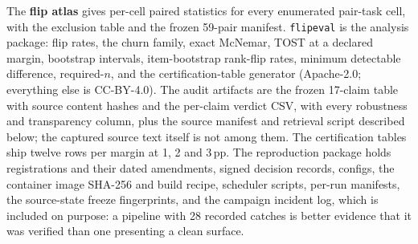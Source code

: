 The \textbf{flip atlas} gives per-cell paired statistics for every enumerated
pair-task cell, with the exclusion table and the frozen 59-pair manifest.
\texttt{flipeval} is the analysis package: flip rates, the churn family, exact
McNemar, TOST at a declared margin, bootstrap intervals, item-bootstrap
rank-flip rates, minimum detectable difference, required-$n$, and the
certification-table generator (Apache-2.0; everything else is CC-BY-4.0). The
audit artifacts are the frozen 17-claim table with source content hashes and the
per-claim verdict CSV, with every robustness and transparency column, plus the
source manifest and retrieval script described below; the captured source text
itself is not among them. The certification tables ship twelve rows per margin
at 1, 2 and 3\,pp. The reproduction package holds registrations and their dated
amendments, signed decision records, configs, the container image SHA-256 and
build recipe, scheduler scripts, per-run manifests, the source-state freeze
fingerprints, and the campaign incident log, which is included on purpose: a
pipeline with 28 recorded catches is better evidence that it was verified than
one presenting a clean surface.

